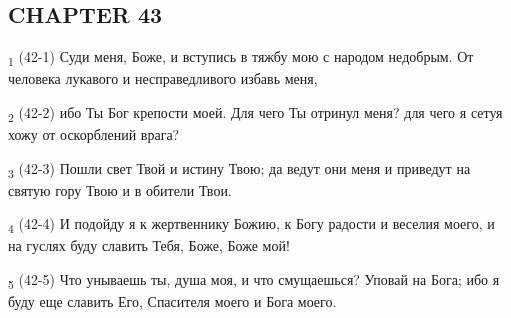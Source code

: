 \subsection{CHAPTER 43}
\begin{tcolorbox}
\textsubscript{1} (42-1) Суди меня, Боже, и вступись в тяжбу мою с народом недобрым. От человека лукавого и несправедливого избавь меня,
\end{tcolorbox}
\begin{tcolorbox}
\textsubscript{2} (42-2) ибо Ты Бог крепости моей. Для чего Ты отринул меня? для чего я сетуя хожу от оскорблений врага?
\end{tcolorbox}
\begin{tcolorbox}
\textsubscript{3} (42-3) Пошли свет Твой и истину Твою; да ведут они меня и приведут на святую гору Твою и в обители Твои.
\end{tcolorbox}
\begin{tcolorbox}
\textsubscript{4} (42-4) И подойду я к жертвеннику Божию, к Богу радости и веселия моего, и на гуслях буду славить Тебя, Боже, Боже мой!
\end{tcolorbox}
\begin{tcolorbox}
\textsubscript{5} (42-5) Что унываешь ты, душа моя, и что смущаешься? Уповай на Бога; ибо я буду еще славить Его, Спасителя моего и Бога моего.
\end{tcolorbox}
